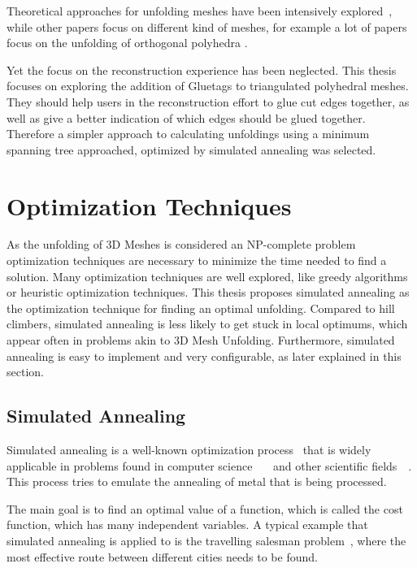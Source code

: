 \documentclass[draft,final]{vutinfth} %
\begin{document}
Theoretical approaches for unfolding meshes have been intensively explored~\cite{shephard1975convex}, while other papers focus on different kind of meshes, for example a lot of papers focus on the unfolding of orthogonal polyhedra \cite{xi2016learning}\cite{damian2007epsilon}\cite{damian2014unfolding}.

Yet the focus on the reconstruction experience has been neglected. This thesis focuses on exploring the addition of Gluetags to triangulated polyhedral meshes. They should help users in the reconstruction effort to glue cut edges together, as well as give a better indication of which edges should be glued together. Therefore a simpler approach to calculating unfoldings using a minimum spanning tree approached, optimized by simulated annealing was selected.

\section{Optimization Techniques}
\label{sec:sa}
As the unfolding of 3D Meshes is considered an NP-complete problem\cite{haenselmann2012optimal} optimization techniques are necessary to minimize the time needed to find a solution. Many optimization techniques are well explored, like greedy algorithms\cite{devore1996some} or heuristic optimization techniques\cite{lee2008modern}. This thesis proposes simulated annealing as the optimization technique for finding an optimal unfolding. Compared to hill climbers, simulated annealing is less likely to get stuck in local optimums, which appear often in problems akin to 3D Mesh Unfolding. Furthermore, simulated annealing is easy to implement and very configurable, as later explained in this section.

\subsection{Simulated Annealing}

Simulated annealing is a well-known optimization process~\cite{kirkpatrick1983optimization} that is widely applicable in problems found in computer science~\cite{goffe1994global}~\cite{dekkers1991global}~\cite{brooks1995optimization} and other scientific fields~\cite{pannetier1990prediction}~\cite{sutter1995automated}. This process tries to emulate the annealing of metal that is being processed.

The main goal is to find an optimal value of a function, which is called the cost function, which has many independent variables. A typical example that simulated annealing is applied to is the travelling salesman problem~\cite{malek1989serial}, where the most effective route between different cities needs to be found. 
\end{document}
